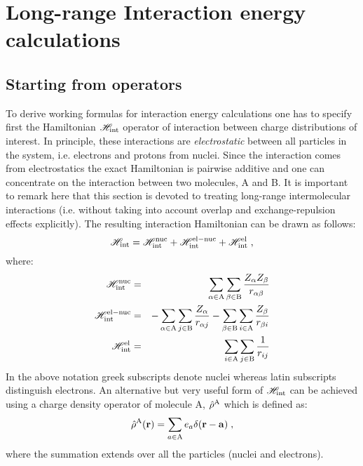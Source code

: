 \documentclass[a4paper,titlepage,twoside,fleqn]{article}
\newcommand{\VEC}[1]{\ensuremath{\mathrm{\mathbf{#1}}}}
\begin{document}
\section{Long-range Interaction energy calculations\label{sec:eint}}
\subsection*{Starting from operators}
To derive working formulas for interaction energy calculations
one has to specify first the Hamiltonian $\mathscr{H}_{\rm int}$ operator of interaction
between charge distributions of interest. In principle, these 
interactions are \emph{electrostatic} between all particles in the 
system, i.e. electrons and protons from nuclei. Since the interaction
comes from electrostatics the exact Hamiltonian is pairwise additive
and one can concentrate on the interaction between two molecules, A 
and B. It is important to remark here that this section is devoted to 
treating long-range intermolecular interactions (i.e. without taking 
into account overlap and exchange-repulsion effects explicitly). The 
resulting interaction Hamiltonian can be drawn as follows: 
\begin{equation}
\mathscr{H}_{\rm int} = \mathscr{H}_{\rm int}^{\rm nuc} + \mathscr{H}_{\rm int}^{\rm el-nuc} + \mathscr{H}_{\rm int}^{\rm el} \; ,
\end{equation}
where:
\begin{eqnarray}
\mathscr{H}_{\rm int}^{\rm nuc}    &=&   \sum_{\alpha \in {\rm A}} \sum_{\beta \in {\rm B}} \frac{Z_{\alpha}Z_{\beta}}{r_{\alpha\beta}} \\
\mathscr{H}_{\rm int}^{\rm el-nuc} &=& - \sum_{\alpha \in {\rm A}} \sum_{j \in {\rm B}} \frac{Z_{\alpha}}{r_{\alpha j}}
                                       - \sum_{\beta  \in {\rm B}} \sum_{i \in {\rm A}} \frac{Z_{\beta }}{r_{\beta  i}} \\
\mathscr{H}_{\rm int}^{\rm el}     &=& \sum_{i  \in {\rm A}} \sum_{j \in {\rm B}} \frac{1}{r_{ij}} 
\end{eqnarray}
In the above notation greek subscripts denote nuclei 
whereas latin subscripts distinguish electrons.
An alternative but very useful form of $\mathscr{H}_{\rm int}$ can be 
achieved using a charge density operator of molecule A, $\hat{\rho}^{\rm A}$
which is defined as:
\begin{equation}\label{e:chd}
\hat{\rho}^{\rm A}(\VEC{r}) = \sum_{a \in {\rm A}} e_a \delta(\VEC{r}-\VEC{a}) \; , 
\end{equation}
where the summation extends over all the particles (nuclei and electrons).
\end{document}
